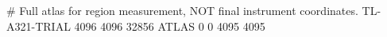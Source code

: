 # Full atlas for region measurement, NOT final instrument coordinates.
TL-A321-TRIAL 4096 4096 32856
ATLAS 0 0 4095 4095
